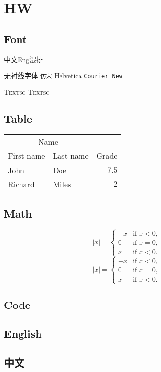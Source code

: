 \chapter{HW}
\section{Font}
\showfont
中文Eng混排\par
\textsf{无衬线字体} \texttt{仿宋} \textsf{Helvetica} \texttt{Courier New}\par
\textsc{Textsc} {\scshape Textsc}
\section{Table}
\begin{table}[H]
    \centering
    \begin{tabular}{llr}
        \toprule
        \multicolumn{2}{c}{Name} \\
        \cmidrule(r){1-2}
        First name & Last name & Grade \\
        \midrule
        John & Doe & $7.5$ \\
        \midrule
        Richard & Miles & $2$\\
        \bottomrule
    \end{tabular}
\end{table}
\section{Math}
\[ |x| = \left\{\begin{array}{rl}
    -x & \text{if }x<0,\\
    0 & \text{if }x=0,\\
    x & \text{if }x<0.
    \end{array} \right. \]
    \[ |x| = \begin{cases}
    -x & \text{if }x<0,\\
    0 & \text{if }x=0,\\
    x & \text{if }x<0.
    \end{cases} \]
\section{Code}

\section{English}
\lipsum[1-3]
\section{中文}
\zhlipsum[3-4]
